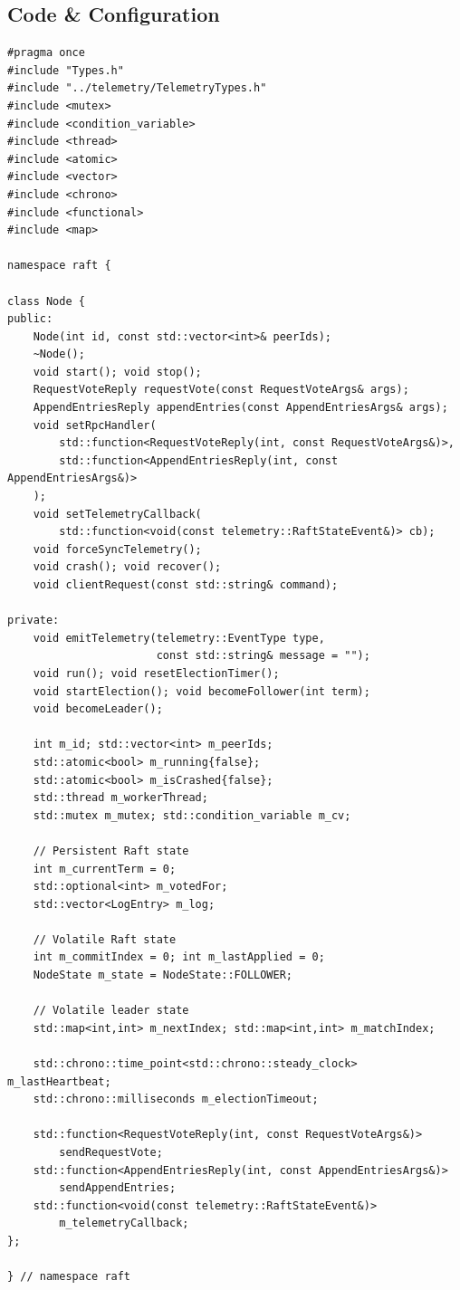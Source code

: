 \documentclass[11pt, a4paper]{article}
\begin{document}
\subsection{Code \& Configuration}
\begin{lstlisting}[style=cppstyle, caption={backend/src/raft\_core/Node.h}]
#pragma once
#include "Types.h"
#include "../telemetry/TelemetryTypes.h"
#include <mutex>
#include <condition_variable>
#include <thread>
#include <atomic>
#include <vector>
#include <chrono>
#include <functional>
#include <map>

namespace raft {

class Node {
public:
    Node(int id, const std::vector<int>& peerIds);
    ~Node();
    void start(); void stop();
    RequestVoteReply requestVote(const RequestVoteArgs& args);
    AppendEntriesReply appendEntries(const AppendEntriesArgs& args);
    void setRpcHandler(
        std::function<RequestVoteReply(int, const RequestVoteArgs&)>,
        std::function<AppendEntriesReply(int, const AppendEntriesArgs&)>
    );
    void setTelemetryCallback(
        std::function<void(const telemetry::RaftStateEvent&)> cb);
    void forceSyncTelemetry();
    void crash(); void recover();
    void clientRequest(const std::string& command);

private:
    void emitTelemetry(telemetry::EventType type,
                       const std::string& message = "");
    void run(); void resetElectionTimer();
    void startElection(); void becomeFollower(int term);
    void becomeLeader();

    int m_id; std::vector<int> m_peerIds;
    std::atomic<bool> m_running{false};
    std::atomic<bool> m_isCrashed{false};
    std::thread m_workerThread;
    std::mutex m_mutex; std::condition_variable m_cv;

    // Persistent Raft state
    int m_currentTerm = 0;
    std::optional<int> m_votedFor;
    std::vector<LogEntry> m_log;

    // Volatile Raft state
    int m_commitIndex = 0; int m_lastApplied = 0;
    NodeState m_state = NodeState::FOLLOWER;

    // Volatile leader state
    std::map<int,int> m_nextIndex; std::map<int,int> m_matchIndex;

    std::chrono::time_point<std::chrono::steady_clock> m_lastHeartbeat;
    std::chrono::milliseconds m_electionTimeout;

    std::function<RequestVoteReply(int, const RequestVoteArgs&)>
        sendRequestVote;
    std::function<AppendEntriesReply(int, const AppendEntriesArgs&)>
        sendAppendEntries;
    std::function<void(const telemetry::RaftStateEvent&)>
        m_telemetryCallback;
};

} // namespace raft
\end{lstlisting}
\end{document}
